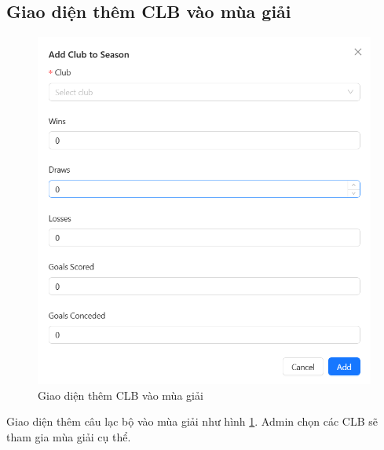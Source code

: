 \documentclass[../BTL.tex]{subfiles}
\begin{document}
\subsection{Giao diện thêm CLB vào mùa giải}
\begin{figure}
    \centering
    \includegraphics[width=1\linewidth]{Hinhve/admin_add_club_season_v2.png}
    \caption{Giao diện thêm CLB vào mùa giải}
    \label{fig:admin_add_club_season}
\end{figure}
Giao diện thêm câu lạc bộ vào mùa giải như hình \ref{fig:admin_add_club_season}. Admin chọn các CLB sẽ tham gia mùa giải cụ thể.
\end{document}
